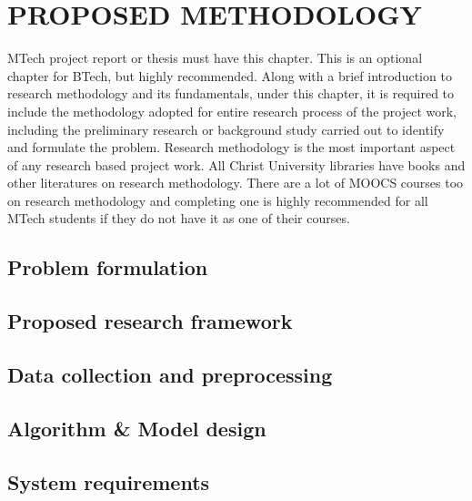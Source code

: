 \chapter{PROPOSED METHODOLOGY} 
\label{ChapterResearchMethodology} 


MTech project report or thesis must have this chapter. This is an optional chapter for BTech, but highly recommended. 
Along with a brief introduction to research methodology and its fundamentals, under this chapter, it is required to include the methodology adopted for entire research process of the project work, including the preliminary research or background study carried out to identify and formulate the problem. 
Research methodology is the most important aspect of any research based project work. All Christ University libraries have books and other literatures on research methodology. There are a lot of MOOCS courses too on research methodology and completing one is highly recommended for all MTech students if they do not have it as one of their courses. 


\section{Problem formulation}


\section{Proposed research framework}

\section{Data collection and preprocessing}

\section{Algorithm \& Model design}

\section{System requirements}


